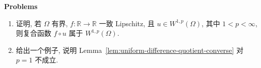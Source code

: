 \textbf{Problems}

\begin{enumerate}[label=\thesection.\arabic*.,ref=\thesection.\arabic*,start=12,series=book-problems]

\item\label{ex:sobolev-composition-uniform-lipschitz-function} 证明, 若 $\Omega$ 有界, $f:\mathbb{R}\to\mathbb{R}$ 一致 Lipschitz, 且 $u\in W^{1,p}(\Omega)$, 其中 $1<p<\infty$, 则复合函数 $f\circ u$ 属于 $W^{1,p}(\Omega)$.

\item\label{ex:difference-quotient-converse-endpoint-failure} 给出一个例子, 说明 Lemma~\ref{lem:uniform-difference-quotient-converse} 对 $p=1$ 不成立.

\end{enumerate}
